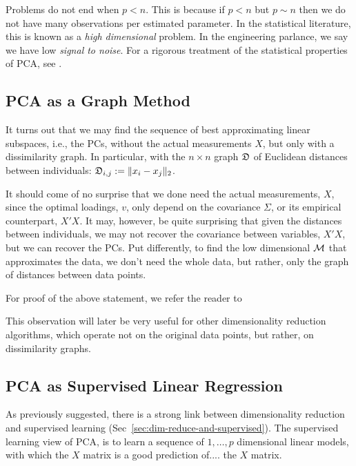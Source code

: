 \documentclass[12pt,a4paper]{article}
\begin{document}
Problems do not end when $p<n$. 
This is because if $p<n$ but $p\sim n$ then we do not have many observations per estimated parameter. 
In the statistical literature, this is known as a \emph{high dimensional} problem. 
In the engineering parlance, we say we have low \emph{signal to noise}.
For a rigorous treatment of the statistical properties of PCA, see \cite{nadler2008finite}.
 


\subsection{PCA as a Graph Method}
\label{sec:pca_as_graph}

It turns out that we may find the sequence of best approximating linear subspaces, i.e., the PCs, without the actual measurements $X$, but only with a dissimilarity graph. 
In particular, with the $n\times n$ graph $\mathfrak{D}$ of Euclidean distances between individuals: $\mathfrak{D}_{i,j}:= \Vert x_i-x_j \Vert_2$. 

It should come of no surprise that we done need the actual measurements, $X$, since the optimal loadings, $v$, only depend on the covariance $\Sigma$, or its empirical counterpart, $X'X$. 
It may, however, be quite surprising that given the distances between individuals, we may not recover the covariance between variables, $X'X$, but we can recover the PCs. 
Put differently, to find the low dimensional $\mathcal{M}$ that approximates the data, we don't need the whole data, but rather, only the graph of distances between data points. 

For proof of the above statement, we refer the reader to \cite[Sec.18.5.2]{friedman2001elements}

This observation will later be very useful for other dimensionality reduction algorithms, which operate not on the original data points, but rather, on dissimilarity graphs. 






\subsection{PCA as Supervised Linear Regression}
As previously suggested, there is a strong link between dimensionality reduction and supervised learning (Sec~\ref{sec:dim-reduce-and-supervised}).
The supervised learning view of PCA, is to learn a sequence of $1,\dots,p$ dimensional linear models, with which the $X$ matrix is a good prediction of.... the $X$ matrix. 
\end{document}
